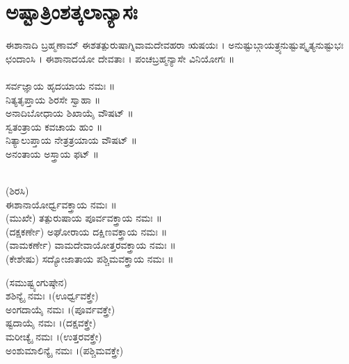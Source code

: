\section{ಅಷ್ಟಾತ್ರಿಂಶತ್ಕಲಾನ್ಯಾಸಃ}
ಈಶಾನಾದಿ ಬ್ರಹ್ಮಣಾಮ್ ಈಶತತ್ಪುರುಷಾಗ್ನಿವಾಮದೇವಹರಾ ಋಷಯಃ । ಅನುಷ್ಟುಬ್ಗಾಯತ್ರ್ಯನುಷ್ಟುಪ್ಕೃತ್ಯನುಷ್ಟುಭಃ ಛಂದಾಂಸಿ । ಈಶಾನಾದಯೋ ದೇವತಾಃ । ಪಂಚಬ್ರಹ್ಮನ್ಯಾಸೇ ವಿನಿಯೋಗಃ ॥\\
\\ ಸರ್ವಜ್ಞಾಯ ಹೃದಯಾಯ ನಮಃ ॥\\
 ನಿತ್ಯತೃಪ್ತಾಯ ಶಿರಸೇ ಸ್ವಾಹಾ ॥\\
 ಅನಾದಿಬೋಧಾಯ ಶಿಖಾಯೈ ವೌಷಟ್ ॥\\
 ಸ್ವತಂತ್ರಾಯ ಕವಚಾಯ ಹುಂ ॥\\
 ನಿತ್ಯಾಲುಪ್ತಾಯ ನೇತ್ರತ್ರಯಾಯ ವೌಷಟ್ ॥\\
 ಅನಂತಾಯ ಅಸ್ತ್ರಾಯ ಫಟ್ ॥

\\
(ಶಿರಸಿ)\\ ಈಶಾನಾಯೋರ್ಧ್ವವಕ್ತ್ರಾಯ ನಮಃ ॥\\
(ಮುಖೇ) ತತ್ಪುರುಷಾಯ ಪೂರ್ವವಕ್ತ್ರಾಯ ನಮಃ ॥\\
(ದಕ್ಷಕರ್ಣೇ) ಅಘೋರಾಯ ದಕ್ಷಿಣವಕ್ತ್ರಾಯ ನಮಃ ॥\\
(ವಾಮಕರ್ಣೇ) ವಾಮದೇವಾಯೋತ್ತರವಕ್ತ್ರಾಯ ನಮಃ ॥\\
(ಕೇಶೇಷು) ಸದ್ಯೋಜಾತಾಯ ಪಶ್ಚಿಮವಕ್ತ್ರಾಯ ನಮಃ ॥

(ಸಮುಷ್ಟ್ಯಂಗುಷ್ಠೇನ)\\
  ಶಶಿನ್ಯೈ ನಮಃ ।(ಊರ್ಧ್ವವಕ್ತ್ರೇ)\\
 ಅಂಗದಾಯೈ ನಮಃ ।(ಪೂರ್ವವಕ್ತ್ರೇ)\\
ಷ್ಟದಾಯೈ ನಮಃ ।(ದಕ್ಷವಕ್ತ್ರೇ)\\
 ಮರೀಚ್ಯೈ ನಮಃ ।(ಉತ್ತರವಕ್ತ್ರೇ)\\
 ಅಂಶುಮಾಲಿನ್ಯೈ ನಮಃ ।(ಪಶ್ಚಿಮವಕ್ತ್ರೇ)

